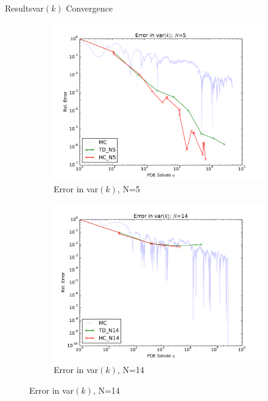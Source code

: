 \documentclass{beamer}
\begin{document}
\begin{frame}{Results}{var$(k)$ Convergence}
  \begin{figure}[h!]
    \centering
    \begin{subfigure}[b]{0.49 \textwidth}
      \includegraphics[width=\textwidth]{../graphics/N5_iso_var_errs}
      \caption{Error in var$(k)$, N=5}
      \label{verr_5}
    \end{subfigure}
    \begin{subfigure}[b]{0.49 \textwidth}
      \includegraphics[width=\textwidth]{../graphics/N14_iso_var_errs}
      \caption{Error in var$(k)$, N=14}
      \label{verr_14}
    \end{subfigure}
  \end{figure}
\end{frame}
\end{document}
